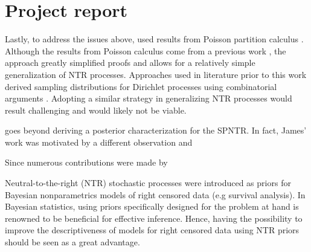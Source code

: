 

\section{Project report}\label{project_report}

Lastly, to address the issues above, \cite{james2006poisson} used results from Poisson partition calculus \cite{james2005poisson}. Although the results from Poisson calculus come from a previous work \cite{james2005poisson}, the approach greatly simplified proofs and allows for a relatively simple generalization of NTR processes. Approaches used in literature prior to this work derived sampling distributions for Dirichlet processes using combinatorial arguments \cite{antoniak1974mixtures,pitman2002combinatorial}. Adopting a similar strategy in generalizing NTR processes would result challenging and would likely not be viable. 

goes beyond deriving a posterior characterization for the SPNTR. In fact, James' work was motivated by a different observation and  


Since numerous contributions were made by \cite{james2006poisson}

Neutral-to-the-right (NTR) stochastic processes \cite{doksum1974tailfree} were introduced as priors for Bayesian nonparametrics models of right censored data (e.g survival analysis). In Bayesian statistics, using priors specifically designed for the problem at hand is renowned to be beneficial for effective inference. Hence, having the possibility to improve the descriptiveness of models for right censored data using NTR priors should be seen as a great advantage. 

